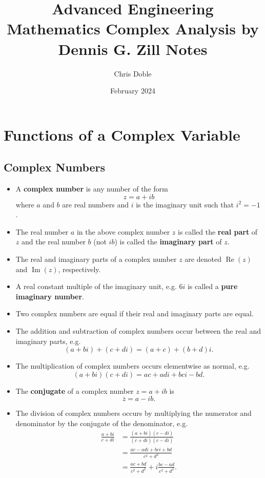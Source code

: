 \documentclass{article}
\title{Advanced Engineering Mathematics Complex Analysis by Dennis G. Zill Notes}
\author{Chris Doble}
\date{February 2024}
\renewcommand{\Im}{\operatorname{Im}}
\renewcommand{\Re}{\operatorname{Re}}
\begin{document}
\maketitle

\tableofcontents

\setcounter{section}{16}
\section{Functions of a Complex Variable}

\subsection{Complex Numbers}

\begin{itemize}
  \item A \textbf{complex number} is any number of the form \[z = a + i b\] where $a$ and $b$ are real numbers and $i$ is the imaginary unit such that $i^2 = -1$.

  \item The real number $a$ in the above complex number $z$ is called the \textbf{real part} of $z$ and the real number $b$ (not $i b$) is called the \textbf{imaginary part} of $z$.

  \item The real and imaginary parts of a complex number $z$ are denoted $\Re(z)$ and $\Im(z)$, respectively.

  \item A real constant multiple of the imaginary unit, e.g. $6 i$ is called a \textbf{pure imaginary number}.

  \item Two complex numbers are equal if their real and imaginary parts are equal.

  \item The addition and subtraction of complex numbers occur between the real and imaginary parts, e.g. \[(a + b i) + (c + d i) = (a + c) + (b + d) i.\]

  \item The multiplication of complex numbers occurs elementwise as normal, e.g. \[(a + b i) (c + d i) = a c + a d i + b c i - b d.\]

  \item The \textbf{conjugate} of a complex number $z = a + i b$ is \[\overline{z} = a - i b.\]

  \item The division of complex numbers occurs by multiplying the numerator and denominator by the conjugate of the denominator, e.g. \begin{align*}
          \frac{a + b i}{c + d i} & = \frac{(a + b i) (c - d i)}{(c + d i) (c - d i)}              \\
                                  & = \frac{a c - a d i + b c i + b d}{c^2 + d^2}                  \\
                                  & = \frac{a c + b d}{c^2 + d^2} + i \frac{b c - a d}{c^2 + d^2}.
        \end{align*}


\end{itemize}
\end{document}
